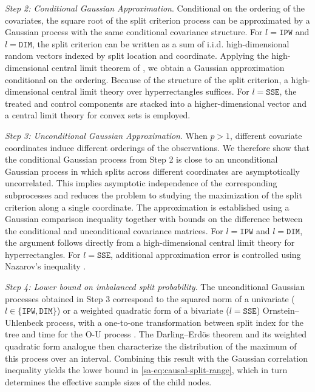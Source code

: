 \documentclass[10pt]{article}
\def\DIM{\mathtt{DIM}}
\def\IPW{\mathtt{IPW}}
\def\SSE{\mathtt{SSE}}
\theoremstyle{definition}
\theoremstyle{remark}
\begin{document}
\emph{Step 2: Conditional Gaussian Approximation}.
Conditional on the ordering of the covariates, the square root of the split criterion process can be approximated by a Gaussian process with the same conditional covariance structure. For $l=\IPW$ and $l=\DIM$, the split criterion can be written as a sum of i.i.d. high-dimensional random vectors indexed by split location and coordinate. Applying the high-dimensional central limit theorem of \citep[Theorem 2.1]{chernozhukov2017central}, we obtain a Gaussian approximation conditional on the ordering. Because of the structure of the split criterion, a high-dimensional central limit theory over hyperrectangles suffices. For $l=\SSE$, the treated and control components are stacked into a higher-dimensional vector and a central limit theory for convex sets \citep[Proposition 3.1]{chernozhukov2017central} is employed.

\emph{Step 3: Unconditional Gaussian Approximation}.
When $p>1$, different covariate coordinates induce different orderings of the observations. We therefore show that the conditional Gaussian process from Step 2 is close to an unconditional Gaussian process in which splits across different coordinates are asymptotically uncorrelated. This implies asymptotic independence of the corresponding subprocesses and reduces the problem to studying the maximization of the split criterion along a single coordinate. The approximation is established using a Gaussian comparison inequality \citep[Proposition 2.1]{chernozhukov2022improved} together with bounds on the difference between the conditional and unconditional covariance matrices. For $l=\IPW$ and $l=\DIM$, the argument follows directly from a high-dimensional central limit theory for hyperrectangles. For $l=\SSE$, additional approximation error is controlled using Nazarov's inequality \citep{nazarov2003maximal}.

\emph{Step 4: Lower bound on imbalanced split probability}.
The unconditional Gaussian processes obtained in Step 3 correspond to the squared norm of a univariate ($l\in\{\IPW,\DIM\}$) or a weighted quadratic form of a bivariate ($l=\SSE$) Ornstein--Uhlenbeck process, with a one-to-one transformation between split index for the tree and time for the O-U process \citep{csorgo1981strong,jaeschke2003survey}. The Darling--Erd\"os theorem \citep{eicker1979asymptotic,horvath1993maximum} and its weighted quadratic form analogue \citep{zhdanov2022high} then characterize the distribution of the maximum of this process over an interval. Combining this result with the Gaussian correlation inequality \citep[Remark 3(i)]{latala2017royen} yields the lower bound in \eqref{sa-eq:causal-split-range}, which in turn determines the effective sample sizes of the child nodes.
\end{document}
